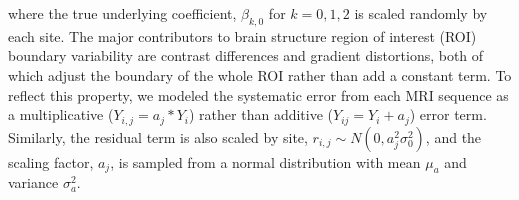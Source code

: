 where the true underlying coefficient,
$\beta_{k,0}$ for  $k=0,1,2$ is scaled randomly by each site. The major contributors to brain structure region of interest (ROI) boundary variability are contrast differences and gradient distortions, both of which adjust the boundary of the whole ROI rather than add a constant term. To reflect this property, we modeled the systematic error from each MRI sequence as a multiplicative ($Y_{i,j} = a_j*Y_i$) rather than additive ($Y_{ij} = Y_i + a_j$) error term. Similarly, the residual term is also scaled by site, $r_{i,j} \sim N(0,a_j^2\sigma_0^2)$, and the scaling factor, $a_j$, is sampled from a normal distribution with mean $\mu_a$ and variance $\sigma_{a}^2$.